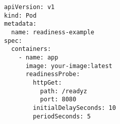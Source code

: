 \begin{verbatim}
apiVersion: v1
kind: Pod
metadata:
  name: readiness-example
spec:
  containers:
    - name: app
      image: your-image:latest
      readinessProbe:
        httpGet:
          path: /readyz
          port: 8080
        initialDelaySeconds: 10
        periodSeconds: 5
\end{verbatim}